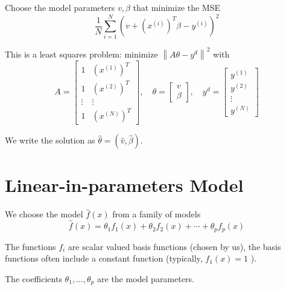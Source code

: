 \begin{problem}
    Choose the model parameters $ v, \beta $ that minimize the MSE
    \begin{equation}
    \frac{1}{N} \sum_{i=1}^{N}\left(v+\left(x^{(i)}\right)^{T} \beta-y^{(i)}\right)^{2}
    \end{equation}

\end{problem}


This is a least squares problem: minimize $ \left\|A \theta-y^{{d}}\right\|^{2} $ with
\begin{equation}
A=\left[\begin{array}{cc}
1 & \left(x^{(1)}\right)^{T} \\
1 & \left(x^{(2)}\right)^{T} \\
\vdots & \vdots \\
1 & \left(x^{(N)}\right)^{T}
\end{array}\right], \quad \theta=\left[\begin{array}{c}
v \\
\beta
\end{array}\right], \quad y^{{d}}=\left[\begin{array}{c}
y^{(1)} \\
y^{(2)} \\
\vdots \\
y^{(N)}
\end{array}\right]
\end{equation}

\begin{notation}
    We write the solution as $ \hat{\theta}=(\hat{v}, \hat{\beta}) $.
\end{notation}



\section{Linear-in-parameters Model}

\begin{problem}
    We choose the model $ \hat{f}(x) $ from a family of models
\begin{equation}
\hat{f}(x)=\theta_{1} f_{1}(x)+\theta_{2} f_{2}(x)+\cdots+\theta_{p} f_{p}(x)
\end{equation}

The functions $ f_{i} $ are scalar valued basis functions (chosen by us), the basis functions often include a constant function (typically, $ f_{1}(x)=1 $ ). 

The coefficients $ \theta_{1}, \ldots, \theta_{p} $ are the model parameters.
\end{problem}

